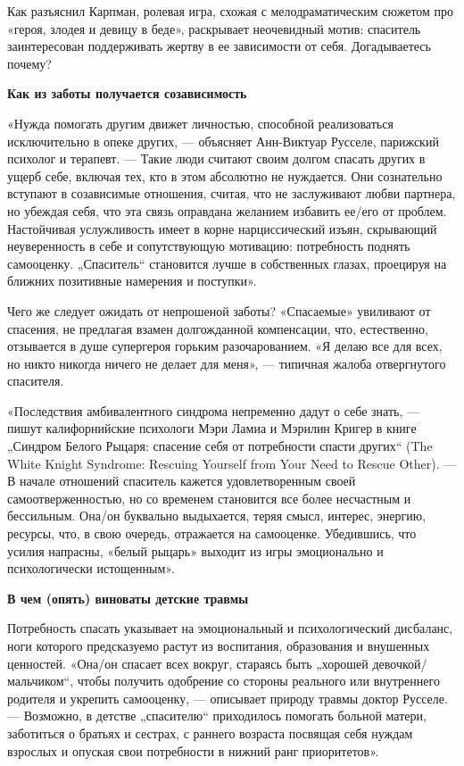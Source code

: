 Как разъяснил Карпман, ролевая игра, схожая с мелодраматическим сюжетом про «героя, злодея и девицу в беде», раскрывает неочевидный мотив: спаситель заинтересован поддерживать жертву в ее зависимости от себя. Догадываетесь почему?

\textbf{Как из заботы получается созависимость}

«Нужда помогать другим движет личностью, способной реализоваться исключительно в опеке других,  ---  объясняет Анн-Виктуар Русселе, парижский психолог и терапевт.  ---  Такие люди считают своим долгом спасать других в ущерб себе, включая тех, кто в этом абсолютно не нуждается. Они сознательно вступают в созависимые отношения, считая, что не заслуживают любви партнера, но убеждая себя, что эта связь оправдана желанием избавить ее/его от проблем. Настойчивая услужливость имеет в корне нарциссический изъян, скрывающий неуверенность в себе и сопутствующую мотивацию: потребность поднять самооценку. „Спаситель“ становится лучше в собственных глазах, проецируя на ближних позитивные намерения и поступки».

Чего же следует ожидать от непрошеной заботы? «Спасаемые» увиливают от спасения, не предлагая взамен долгожданной компенсации, что, естественно, отзывается в душе супергероя горьким разочарованием. «Я делаю все для всех, но никто никогда ничего не делает для меня»,  ---  типичная жалоба отвергнутого спасителя.

«Последствия амбивалентного синдрома непременно дадут о себе знать,  ---  пишут калифорнийские психологи Мэри Ламиа и Мэрилин Кригер в книге „Синдром Белого Рыцаря: спасение себя от потребности спасти других“ (The White Knight Syndrome: Rescuing Yourself from Your Need to Rescue Other).  ---  В начале отношений спаситель кажется удовлетворенным своей самоотверженностью, но со временем становится все более несчастным и бессильным. Она/он буквально выдыхается, теряя смысл, интерес, энергию, ресурсы, что, в свою очередь, отражается на самооценке. Убедившись, что усилия напрасны, «белый рыцарь» выходит из игры эмоционально и психологически истощенным».

\textbf{В чем (опять) виноваты детские травмы}

Потребность спасать указывает на эмоциональный и психологический дисбаланс, ноги которого предсказуемо растут из воспитания, образования и внушенных ценностей. «Она/он спасает всех вокруг, стараясь быть „хорошей девочкой/мальчиком“, чтобы получить одобрение со стороны реального или внутреннего родителя и укрепить самооценку,  ---  описывает природу травмы доктор Русселе.  ---  Возможно, в детстве „спасителю“ приходилось помогать больной матери, заботиться о братьях и сестрах, с раннего возраста посвящая себя нуждам взрослых и опуская свои потребности в нижний ранг приоритетов».

